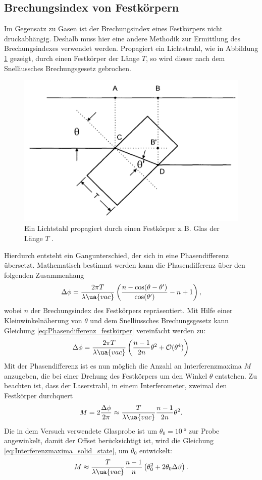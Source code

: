 \subsection{Brechungsindex von Festkörpern}
Im Gegensatz zu Gasen ist der Brechungsindex eines Festkörpers nicht druckabhängig.
Deshalb muss hier eine andere Methodik zur Ermittlung des Brechungsindexes verwendet werden.
Propagiert ein Lichtstrahl, wie in Abbildung \ref{fig:slag} gezeigt, durch einen Festkörper der Länge $T$,
so wird dieser nach dem Snelliussches Brechungsgesetz gebrochen.
\begin{figure}
\centering
\includegraphics[width=0.6\linewidth]{./content/images/slab.png}
\caption{Ein Lichtstahl propagiert durch einen Festkörper z.\,B. Glas der Länge $T$ \cite{anleitung64}.}
\label{fig:slag}
\end{figure}
Hierdurch entsteht ein Gangunterschied, der sich in eine Phasendifferenz übersetzt.
Mathematisch bestimmt werden kann die Phasendifferenz über den folgenden Zusammenhang
\begin{equation}
  \label{eq:Phasendifferenz_festkörper}
  \Delta\phi=\frac{ 2\pi T }{ \lambda\ua{vac} }\left( \frac{ n-\cos(\theta-\theta') }{ \cos(\theta') } - n+1\right),
\end{equation}
wobei $n$ der Brechungsindex des Festkörpers repräsentiert.
Mit Hilfe einer Kleinwinkelnäherung von $\theta$ und dem Snelliussches Brechungsgesetz kann
Gleichung \eqref{eq:Phasendifferenz_festkörper} vereinfacht werden zu:
\begin{equation}
  \Delta\phi=\frac{ 2\pi T }{ \lambda\ua{vac} }\left( \frac{ n-1 }{ 2n }\theta^2 + \mathcal{O}(\theta^4)\right)
\end{equation}
Mit der Phasendifferenz ist es nun möglich die Anzahl an Interferenzmaxima $M$ anzugeben, die bei einer Drehung
des Festkörpers um den Winkel $\theta$ entstehen. Zu beachten ist, dass der Laserstrahl, in einem Interferometer, zweimal den Festkörper durchquert
\begin{equation}
  \label{eq:Interferenzmaxima_solid_state}
  M=2\frac{\Delta\phi}{2\pi}\approx \frac{T}{\lambda\ua{vac}}\frac{n-1}{2n}\theta^2.
\end{equation}
Die in dem Versuch verwendete Glasprobe ist um $\theta_0 = \SI{10}{\degree}$ zur Probe angewinkelt,
damit der Offset berücksichtigt ist, wird die Gleichung \eqref{eq:Interferenzmaxima_solid_state},
um $\theta_0$ entwickelt:
\begin{equation}
\label{eq:entwicklung_interferenzmaxima}
  M\approx\frac{T}{\lambda\ua{vac}}\frac{n-1}{n}\left(\theta_0^2 + 2\theta_0 \Delta \vartheta \right).
\end{equation}

